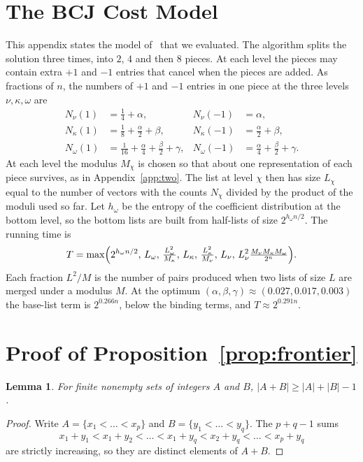 \documentclass[conference]{IEEEtran}
\newtheorem{lemma}{Lemma}
\begin{document}
\section{The BCJ Cost Model}\label{app:bcj}
This appendix states the model of~\cite{bcj} that we evaluated. The algorithm
splits the solution three times, into $2$, $4$ and then $8$ pieces. At each
level the pieces may contain extra $+1$ and $-1$ entries that cancel when the
pieces are added. As fractions of $n$, the numbers of $+1$ and $-1$ entries in
one piece at the three levels $\nu,\kappa,\omega$ are
\begin{align*}
N_\nu(1)&=\tfrac14+\alpha, & N_\nu(-1)&=\alpha,\\
N_\kappa(1)&=\tfrac18+\tfrac\alpha2+\beta, & N_\kappa(-1)&=\tfrac\alpha2+\beta,\\
N_\omega(1)&=\tfrac1{16}+\tfrac\alpha4+\tfrac\beta2+\gamma, &
N_\omega(-1)&=\tfrac\alpha4+\tfrac\beta2+\gamma.
\end{align*}
At each level the modulus $M_\chi$ is chosen so that about one representation of
each piece survives, as in Appendix~\ref{app:two}. The list at level $\chi$ then
has size $L_\chi$ equal to the number of vectors with the counts $N_\chi$
divided by the product of the moduli used so far. Let $h_\omega$ be the entropy
of the coefficient distribution at the bottom level, so the bottom lists are
built from half-lists of size $2^{h_\omega n/2}$. The running time is
\[
T=\max\Bigl(2^{h_\omega n/2},\,L_\omega,\,\tfrac{L_\omega^2}{M_\kappa},\,
L_\kappa,\,\tfrac{L_\kappa^2}{M_\nu},\,L_\nu,\,
L_\nu^2\tfrac{M_\nu M_\kappa M_\omega}{2^n}\Bigr).
\]
Each fraction $L^2/M$ is the number of pairs produced when two lists of size
$L$ are merged under a modulus $M$. At the optimum
$(\alpha,\beta,\gamma)\approx(0.027,0.017,0.003)$ the base-list term is
$2^{0.266n}$, below the binding terms, and $T\approx2^{0.291n}$.

\section{Proof of Proposition~\ref{prop:frontier}}\label{app:frontier}

\begin{lemma}\label{lem:sumset}
For finite nonempty sets of integers $A$ and $B$,
$|A+B|\ge|A|+|B|-1$.
\end{lemma}
\begin{proof}
Write $A=\{x_1<\dots<x_p\}$ and $B=\{y_1<\dots<y_q\}$. The $p+q-1$ sums
\[
x_1+y_1<x_1+y_2<\dots<x_1+y_q<x_2+y_q<\dots<x_p+y_q
\]
are strictly increasing, so they are distinct elements of $A+B$.
\end{proof}
\end{document}
